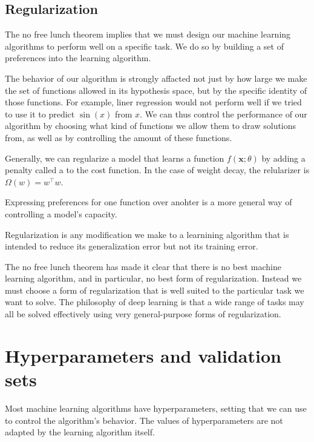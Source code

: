 \subsection{Regularization}

The no free lunch theorem implies that we must design our machine learning algorithms to perform well on a specific task.
We do so by building a set of preferences into the learning algorithm.

The behavior of our algorithm is strongly affacted not just by how large we make the set of functions allowed in its hypothesis space, but by the specific identity of those functions.
For example, liner regression would not perform well if we tried to use it to predict $\sin(x)$ from $x$.
We can thus control the performance of our algorithm by choosing what kind of functions we allow them to draw solutions from, as well as by controlling the amount of these functions.

Generally, we can regularize a model that learns a function $f(\bm{x};\theta)$ by adding a penalty called a  to the cost function.
In the case of weight decay, the relularizer is $\Omega(w) = w^\top w$.

Expressing preferences for one function over anohter is a more general way of controlling a model's capacity.

\begin{tcolorbox}
  Regularization is any modification we make to a learnining algorithm that is intended to reduce its generalization error but not its training error.
\end{tcolorbox}


The no free lunch theorem has made it clear that there is no best machine learning algorithm, and in particular, no best form of regularization.
Instead we must choose a form of regularization that is well suited to the particular task we want to solve.
The philosophy of deep learning is that a wide range of tasks may all be solved effectively using very general-purpose forms of regularization.

\section{Hyperparameters and validation sets}

Most machine learning algorithms have hyperparameters, setting that we can use to control the algorithm's behavior.
The values of hyperparameters are not adapted by the learning algorithm itself.


